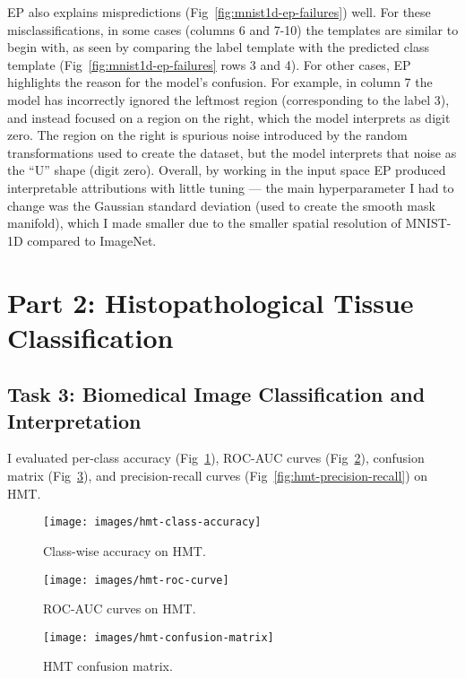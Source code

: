 \documentclass{article}
\begin{document}
EP also explains mispredictions (Fig~\ref{fig:mnist1d-ep-failures}) well.
For these misclassifications, in some cases (columns 6 and 7-10) the templates are similar to begin with, as seen by comparing the label template with the predicted class template (Fig~\ref{fig:mnist1d-ep-failures} rows 3 and 4).
For other cases, EP highlights the reason for the model's confusion.
For example, in column 7 the model has incorrectly ignored the leftmost region (corresponding to the label 3), and instead focused on a region on the right, which the model interprets as digit zero.
The region on the right is spurious noise introduced by the random transformations used to create the dataset, but the model interprets that noise as the ``U'' shape (digit zero).
Overall, by working in the input space EP produced interpretable attributions with little tuning --- the main hyperparameter I had to change was the Gaussian standard deviation (used to create the smooth mask manifold), which I made smaller due to the smaller spatial resolution of MNIST-1D compared to ImageNet.


\section{Part 2: Histopathological Tissue Classification}

\subsection{Task 3: Biomedical Image Classification and Interpretation}

I evaluated per-class accuracy (Fig~\ref{fig:hmt-classwise-accuracy}), ROC-AUC curves (Fig~\ref{fig:hmt-roc-curve}), confusion matrix (Fig~\ref{fig:hmt-confusion-matrix}), and precision-recall curves (Fig~\ref{fig:hmt-precision-recall}) on HMT\@.
\begin{figure}[t]
	\texttt{[image: images/hmt-class-accuracy]}
	\caption{\label{fig:hmt-classwise-accuracy}Class-wise accuracy on HMT\@.}
\end{figure}

\begin{figure}[t]
	\texttt{[image: images/hmt-roc-curve]}
	\caption{\label{fig:hmt-roc-curve}ROC-AUC curves on HMT\@.}
\end{figure}

\begin{figure}[t]
	\texttt{[image: images/hmt-confusion-matrix]}
	\caption{\label{fig:hmt-confusion-matrix}HMT confusion matrix.}
\end{figure}
\end{document}

